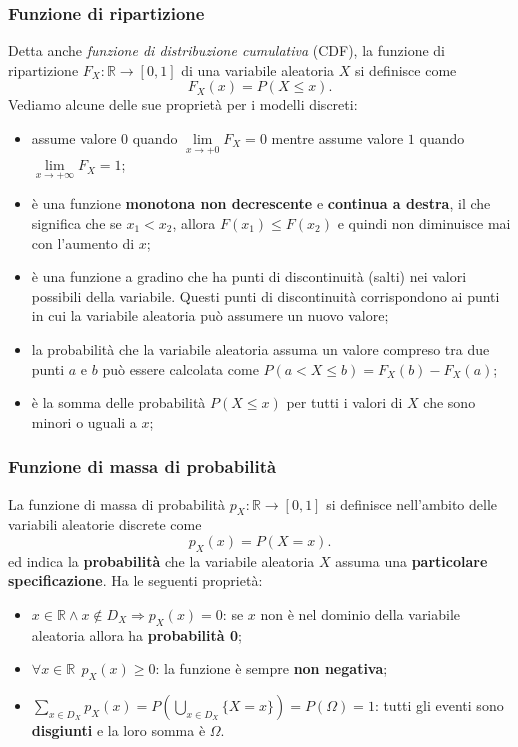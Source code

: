 \subsubsection{Funzione di ripartizione}
Detta anche \textit{funzione di distribuzione cumulativa} (CDF), la funzione di ripartizione $F_X: \mathbb{R} \rightarrow [0,1]$ di una variabile aleatoria $X$ si definisce come
\[
\boxed{F_X(x) = P(X \leq x)}.
\]
Vediamo alcune delle sue proprietà per i modelli discreti:
\begin{itemize}
    \item assume valore $0$ quando $\lim\limits_{x \rightarrow +0} F_X = 0$ mentre assume valore $1$ quando $\lim\limits_{x \rightarrow +\infty} F_X = 1$;
    \item è una funzione \textbf{monotona non decrescente} e \textbf{continua a destra}, il che significa che se $x_1 < x_2$, allora $F(x_1) \leq F(x_2)$ e quindi non diminuisce mai con l'aumento di $x$;
    \item è una funzione a gradino che ha punti di discontinuità (salti) nei valori possibili della variabile. Questi punti di discontinuità corrispondono ai punti in cui la variabile aleatoria può assumere un nuovo valore;
    \item la probabilità che la variabile aleatoria assuma un valore compreso tra due punti $a$ e $b$ può essere calcolata come $P(a < X \leq b) = F_X(b) - F_X(a)$;
    \item è la somma delle probabilità $P(X \leq x)$ per tutti i valori di $X$ che sono minori o uguali a $x$;
\end{itemize}

\subsubsection{Funzione di {massa di probabilità}}
La funzione di massa di probabilità $p_X : \mathbb R \rightarrow [ 0, 1 ]$ si definisce nell'ambito delle variabili aleatorie discrete come \[
\boxed{p_X(x) = P(X = x)}.
\] ed indica la \textbf{probabilità} che la variabile aleatoria $X$ assuma una \textbf{particolare specificazione}. Ha le seguenti proprietà: \begin{itemize}
    \item $x \in \mathbb R \land x \notin D_X \Rightarrow p_X(x) = 0$: se $x$ non è nel dominio della variabile aleatoria allora ha \textbf{probabilità 0};
    \item $\forall x \in \mathbb R \ \  p_X(x) \geq 0$: la funzione è sempre \textbf{non negativa};
    \item $\sum_{x \in D_X} p_X(x) = P\left( \bigcup_{x \in D_X} \{ X = x \} \right) = P(\Omega) = 1$: tutti gli eventi sono \textbf{disgiunti} e la loro somma è $\Omega$.
\end{itemize}

